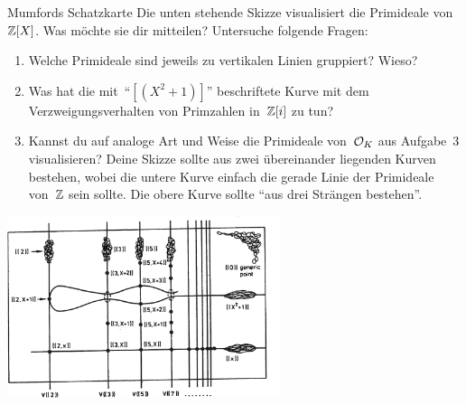 \documentclass{uebblatt}
\begin{document}
\begin{aufgabe}{Mumfords Schatzkarte}
Die unten stehende Skizze visualisiert die Primideale von~$\mathbb{Z}[X]$.
Was möchte sie dir mitteilen? Untersuche folgende Fragen:
\begin{enumerate}
\item Welche Primideale sind jeweils zu vertikalen Linien gruppiert? Wieso?
\item Was hat die mit~"`$[(X^2+1)]$"' beschriftete Kurve mit dem
Verzweigungsverhalten von Primzahlen in~$\mathbb{Z}[i]$ zu tun?
\item Kannst du auf analoge Art und Weise die Primideale von~$\mathcal{O}_K$ aus
Aufgabe~3 visualisieren? Deine Skizze sollte aus zwei übereinander liegenden
Kurven bestehen, wobei die untere Kurve einfach die gerade Linie der Primideale
von~$\mathbb{Z}$ sein sollte. Die obere Kurve sollte "`aus drei Strängen bestehen"'.
\end{enumerate}
\centering\includegraphics[width=0.6\textwidth]{images/mumfords-treasure-map}\par
\end{aufgabe}
\end{document}
